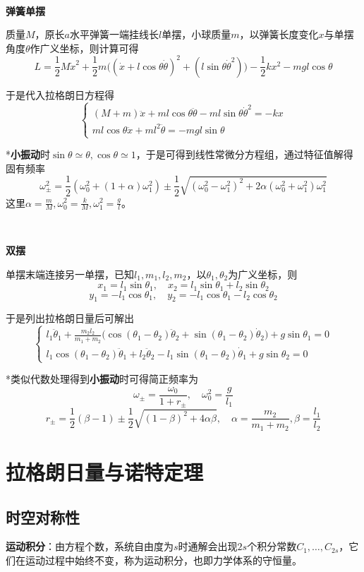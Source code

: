 \documentclass[a4paper,UTF8,fontset=windows]{ctexart}
\begin{document}
\

\textbf{弹簧单摆}

质量$M$，原长$a$水平弹簧一端挂线长$l$单摆，小球质量$m$，以弹簧长度变化$x$与单摆角度$\theta$作广义坐标，则计算可得
$$L=\frac{1}{2}M\dot{x}^2+\frac{1}{2}m\big((\dot{x}+l\cos\theta\dot{\theta})^2+(l\sin\theta\dot{\theta}^2)\big)-\frac{1}{2}kx^2-mgl\cos\theta$$

于是代入拉格朗日方程得
$$\begin{cases}(M+m)\ddot{x}+ml\cos\theta\ddot{\theta}-ml\sin\theta\dot{\theta}^2=-kx\\ml\cos\theta\ddot{x}+ml^2\ddot{\theta}=-mgl\sin\theta\end{cases}$$

*\textbf{小振动}时$\sin\theta\simeq\theta,\cos\theta\simeq1$，于是可得到线性常微分方程组，通过特征值解得固有频率
$$\omega_{\pm}^2=\frac{1}{2}(\omega_0^2+(1+\alpha)\omega_1^2)\pm\frac{1}{2}\sqrt{(\omega_0^2-\omega_1^2)^2+2\alpha(\omega_0^2+\omega_1^2)\omega_1^2}$$
这里$\alpha=\frac{m}{M},\omega_0^2=\frac{k}{M},\omega_1^2=\frac{g}{l}$。

\

\textbf{双摆}

单摆末端连接另一单摆，已知$l_1,m_1,l_2,m_2$，以$\theta_1,\theta_2$为广义坐标，则
$$x_1=l_1\sin\theta_1,\quad x_2=l_1\sin\theta_1+l_2\sin\theta_2$$
$$y_1=-l_1\cos\theta_1,\quad y_2=-l_1\cos\theta_1-l_2\cos\theta_2$$

于是列出拉格朗日量后可解出
$$\begin{cases}l_1\ddot{\theta}_1+\frac{m_2l_2}{m_1+m_2}\big(\cos(\theta_1-\theta_2)\ddot{\theta}_2+\sin(\theta_1-\theta_2)\dot{\theta}_2\big)+g\sin\theta_1=0\\l_1\cos(\theta_1-\theta_2)\ddot{\theta}_1+l_2\ddot{\theta}_2-l_1\sin(\theta_1-\theta_2)\dot{\theta}_1+g\sin\theta_2=0\end{cases}$$

*类似代数处理得到\textbf{小振动}时可得简正频率为$$\omega_\pm=\frac{\omega_0}{1+r_\pm},\quad \omega_0^2=\frac{g}{l_1}$$
$$r_\pm=\frac{1}{2}(\beta-1)\pm\frac{1}{2}\sqrt{(1-\beta)^2+4\alpha\beta},\quad\alpha=\frac{m_2}{m_1+m_2},\beta=\frac{l_1}{l_2}$$

\section{拉格朗日量与诺特定理}
\subsection{时空对称性}
\textbf{运动积分}：由方程个数，系统自由度为$s$时通解会出现$2s$个积分常数$C_1,\dots,C_{2s}$，它们在运动过程中始终不变，称为运动积分，也即力学体系的守恒量。
\end{document}

